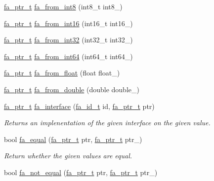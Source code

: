 \begin{DoxyCompactItemize}
\item 
\hyperlink{group___fa_ga915ddeae99ad7568b273d2b876425197}{fa\-\_\-ptr\-\_\-t} \hyperlink{group___fa_gae59bb48493214037997a78b65814ba02}{fa\-\_\-from\-\_\-int8} (int8\-\_\-t int8\-\_\-)
\item 
\hyperlink{group___fa_ga915ddeae99ad7568b273d2b876425197}{fa\-\_\-ptr\-\_\-t} \hyperlink{group___fa_ga2ab9996cc0d378c9c6b3b302011e09a4}{fa\-\_\-from\-\_\-int16} (int16\-\_\-t int16\-\_\-)
\item 
\hyperlink{group___fa_ga915ddeae99ad7568b273d2b876425197}{fa\-\_\-ptr\-\_\-t} \hyperlink{group___fa_gae872f63b8860e24d21166fbabb0d6bc0}{fa\-\_\-from\-\_\-int32} (int32\-\_\-t int32\-\_\-)
\item 
\hyperlink{group___fa_ga915ddeae99ad7568b273d2b876425197}{fa\-\_\-ptr\-\_\-t} \hyperlink{group___fa_gadb00915203c212a107f8fab09328cb39}{fa\-\_\-from\-\_\-int64} (int64\-\_\-t int64\-\_\-)
\item 
\hyperlink{group___fa_ga915ddeae99ad7568b273d2b876425197}{fa\-\_\-ptr\-\_\-t} \hyperlink{group___fa_gae3c3ae262ec23b01ba4664899d89bbc4}{fa\-\_\-from\-\_\-float} (float float\-\_\-)
\item 
\hyperlink{group___fa_ga915ddeae99ad7568b273d2b876425197}{fa\-\_\-ptr\-\_\-t} \hyperlink{group___fa_ga550b80dd4d78000cdd38bd7c3458fd08}{fa\-\_\-from\-\_\-double} (double double\-\_\-)
\item 
\hyperlink{group___fa_ga915ddeae99ad7568b273d2b876425197}{fa\-\_\-ptr\-\_\-t} \hyperlink{group___fa_ga1cc4276643f3d366681ac7ff71fa8b06}{fa\-\_\-interface} (\hyperlink{group___fa_gaeb5011c69dfea4d2c41c05a2c95899d0}{fa\-\_\-id\-\_\-t} id, \hyperlink{group___fa_ga915ddeae99ad7568b273d2b876425197}{fa\-\_\-ptr\-\_\-t} ptr)
\begin{DoxyCompactList}\small\item\em Returns an implenentation of the given interface on the given value. \end{DoxyCompactList}\item 
bool \hyperlink{group___fa_gaded838536607ac403241cde9fd5a4d02}{fa\-\_\-equal} (\hyperlink{group___fa_ga915ddeae99ad7568b273d2b876425197}{fa\-\_\-ptr\-\_\-t} ptr, \hyperlink{group___fa_ga915ddeae99ad7568b273d2b876425197}{fa\-\_\-ptr\-\_\-t} ptr\-\_\-)
\begin{DoxyCompactList}\small\item\em Return whether the given values are equal. \end{DoxyCompactList}\item 
bool \hyperlink{group___fa_ga18edc1c7d73e70df4d925bbc7f125b7f}{fa\-\_\-not\-\_\-equal} (\hyperlink{group___fa_ga915ddeae99ad7568b273d2b876425197}{fa\-\_\-ptr\-\_\-t} ptr, \hyperlink{group___fa_ga915ddeae99ad7568b273d2b876425197}{fa\-\_\-ptr\-\_\-t} ptr\-\_\-)

\end{DoxyCompactItemize}
